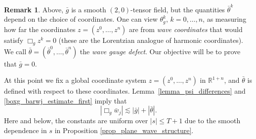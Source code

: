 \documentclass[11pt,letterpaper]{amsart}
\theoremstyle{definition}
\newtheorem{Remark}[Theorem]{Remark}
\numberwithin{equation}{section}
\newcommand{\mR}{\mathbb{R}}                    %
\begin{document}
\begin{Remark}
Above, $\bar{g}$ is a smooth $(2,0)$-tensor field, but the quantities $\bar{\theta}^k$ depend on the choice of coordinates. One can view $\theta_g^k$, $k=0,\dots,n$, as measuring how far the coordinates $z = (z^0, \dots, z^n)$ are from \emph{wave coordinates} that would satisfy $\Box_g z^k = 0$ (these are the Lorentzian analogue of harmonic coordinates). We call $\bar{\theta} = (\bar{\theta}^0, \ldots, \bar{\theta}^n)$ the \emph{wave gauge defect}. Our objective will be to prove that $\bar{g} = 0$.
\end{Remark}


At this point we fix a global coordinate system $z = (z^0, \ldots, z^n)$ in $\mR^{1+n}$, and $\bar\theta$ is defined with respect to these coordinates. Lemma~\ref{lemma_psi_differences} and \eqref{boxg_barwj_estimate_first} imply that 
\begin{equation} \label{boxgbarwj_estimate}
|\Box_g \bar{w}_j| \lesssim |\bar{g}| + |\bar{\theta}|.
\end{equation}
Here and below, the constants are uniform over $|s| \leq T+1$ due to the smooth dependence in $s$ in Proposition \ref{prop_plane_wave_structure}.
\end{document}
